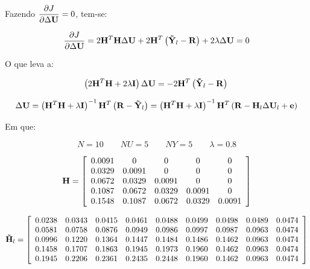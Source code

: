 Fazendo $\displaystyle\frac{\partial J}{\partial\Delta\mathbf{U}} = 0$, tem-se:

\begin{equation*}
\frac{\partial J}{\partial\Delta\mathbf{U}} = 
2\mathbf{H}^T\mathbf{H}\Delta\mathbf{U} + 
2\mathbf{H}^T\left(\mathbf{\tilde{Y}}_l-\mathbf{R}\right) +
2\lambda\Delta\mathbf{U} = 0
\end{equation*}

O que leva a:

\begin{equation*}
\left(2\mathbf{H}^T\mathbf{H} + 2\lambda \mathbf{I}\right)\Delta\mathbf{U} = -
2\mathbf{H}^T\left(\mathbf{\tilde{Y}}_l-\mathbf{R}\right) \\
\end{equation*}

\begin{equation}\label{eq:delta_u}
\Delta\mathbf{U} = \left(\mathbf{H}^T\mathbf{H}+\lambda\mathbf{I}\right)^{-1}\mathbf{H}^T
               \left(\mathbf{R}-\mathbf{\tilde{Y}}_l\right) = 
               \left(\mathbf{H}^T\mathbf{H}+\lambda\mathbf{I}\right)^{-1}\mathbf{H}^T
               \left(\mathbf{R}-\mathbf{H}_l\Delta\mathbf{U}_l+\mathbf{e}\right)
\end{equation}

Em que:

\begin{equation*}
N = 10 \qquad NU = 5 \qquad NY = 5 \qquad \lambda = 0.8
\end{equation*}

\begin{equation*}
\mathbf{H} = 
\left[
\begin{array}{ccccc}
0.0091 &      0 &      0 &      0 &      0\\
0.0329 & 0.0091 &      0 &      0 &      0\\
0.0672 & 0.0329 & 0.0091 &      0 &      0\\
0.1087 & 0.0672 & 0.0329 & 0.0091 &      0\\
0.1548 & 0.1087 & 0.0672 & 0.0329 & 0.0091
\end{array}
\right]
\end{equation*}

\begin{equation*}
\mathbf{\tilde{H}}_l = 
\left[
\begin{array}{ccccccccc}
0.0238 & 0.0343 & 0.0415 & 0.0461 & 0.0488 & 0.0499 & 0.0498 & 0.0489 & 0.0474\\
0.0581 & 0.0758 & 0.0876 & 0.0949 & 0.0986 & 0.0997 & 0.0987 & 0.0963 & 0.0474\\
0.0996 & 0.1220 & 0.1364 & 0.1447 & 0.1484 & 0.1486 & 0.1462 & 0.0963 & 0.0474\\
0.1458 & 0.1707 & 0.1863 & 0.1945 & 0.1973 & 0.1960 & 0.1462 & 0.0963 & 0.0474\\
0.1945 & 0.2206 & 0.2361 & 0.2435 & 0.2448 & 0.1960 & 0.1462 & 0.0963 & 0.0474
\end{array}
\right]
\end{equation*}

